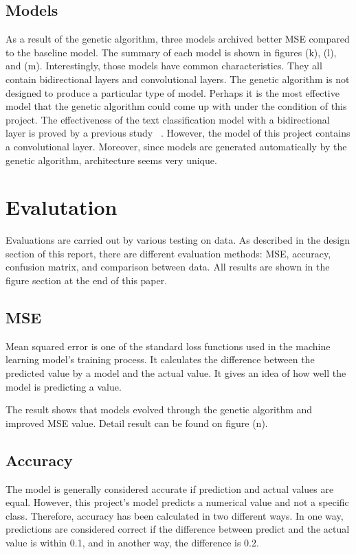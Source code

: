 \documentclass[11pt, natbib=false]{article}
\begin{document}
\subsection{Models}
As a result of the genetic algorithm, three models archived better MSE compared to the baseline model.
The summary of each model is shown in figures (k), (l), and (m).
Interestingly, those models have common characteristics.
They all contain bidirectional layers and convolutional layers. The genetic algorithm is not designed to produce a particular type of model.
Perhaps it is the most effective model that the genetic algorithm could come up with under the condition of this project.
The effectiveness of the text classification model with a bidirectional layer is proved by a previous study ~\cite{hada2021ruddit}.
However, the model of this project contains a convolutional layer.
Moreover, since models are generated automatically by the genetic algorithm, architecture seems very unique.

\section{Evalutation}
Evaluations are carried out by various testing on data.
As described in the design section of this report, there are different evaluation methods: MSE, accuracy, confusion matrix, and comparison between data.
All results are shown in the figure section at the end of this paper.

\subsection{MSE}
Mean squared error is one of the standard loss functions used in the machine learning model's training process.
It calculates the difference between the predicted value by a model and the actual value.
It gives an idea of how well the model is predicting a value.

The result shows that models evolved through the genetic algorithm and improved MSE value.
Detail result can be found on figure (n).

\subsection{Accuracy}
The model is generally considered accurate if prediction and actual values are equal.
However, this project's model predicts a numerical value and not a specific class.
Therefore, accuracy has been calculated in two different ways.
In one way, predictions are considered correct if the difference between predict and the actual value is within 0.1, and in another way, the difference is 0.2.
\end{document}
